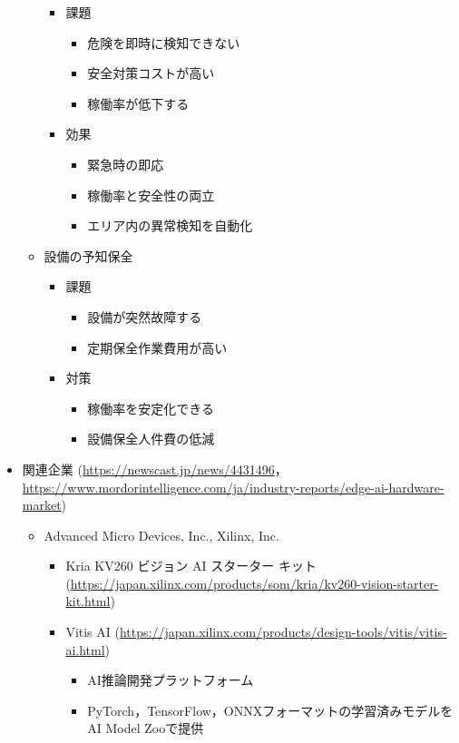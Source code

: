 \begin{itemize}
\begin{itemize}
\begin{itemize}
			\item 課題
			\begin{itemize}
				\item 危険を即時に検知できない
				\item 安全対策コストが高い
				\item 稼働率が低下する
			\end{itemize}
			\item 効果
			\begin{itemize}
				\item 緊急時の即応
				\item 稼働率と安全性の両立
				\item エリア内の異常検知を自動化
			\end{itemize}
		\end{itemize}
		\item 設備の予知保全
		\begin{itemize}
			\item 課題
			\begin{itemize}
				\item 設備が突然故障する
				\item 定期保全作業費用が高い
			\end{itemize}
			\item 対策
			\begin{itemize}
				\item 稼働率を安定化できる
				\item 設備保全人件費の低減
			\end{itemize}
		\end{itemize}
	\end{itemize}
	\item 関連企業 (\url{https://newscast.jp/news/4431496}，\url{https://www.mordorintelligence.com/ja/industry-reports/edge-ai-hardware-market})
	\begin{itemize}
		\item Advanced Micro Devices, Inc., Xilinx, Inc.
		\begin{itemize}
			\item Kria KV260 ビジョン AI スターター キット (\url{https://japan.xilinx.com/products/som/kria/kv260-vision-starter-kit.html})
			\item Vitis AI (\url{https://japan.xilinx.com/products/design-tools/vitis/vitis-ai.html})
			\begin{itemize}
				\item AI推論開発プラットフォーム
				\item PyTorch，TensorFlow，ONNXフォーマットの学習済みモデルをAI Model Zooで提供

\end{itemize}
\end{itemize}
\end{itemize}
\end{itemize}
